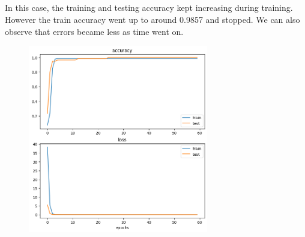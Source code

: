 \documentclass{article}
\begin{document}
\begin{CJK*}{UTF8}{bsmi}
\subsection*{}
    \begin{spacing}{2.5}
        \begin{large}
            In this case, the training and testing accuracy kept increasing during training. However the train 
            accuracy went up to around 0.9857 and stopped. We can also observe that errors became less as time 
            went on.
            \begin{figure}[h]
                \centering
                \includegraphics[width=0.7\textwidth]{output1.png}
            \end{figure}
        \end{large}
    \end{spacing}

\end{CJK*}
\end{document}
